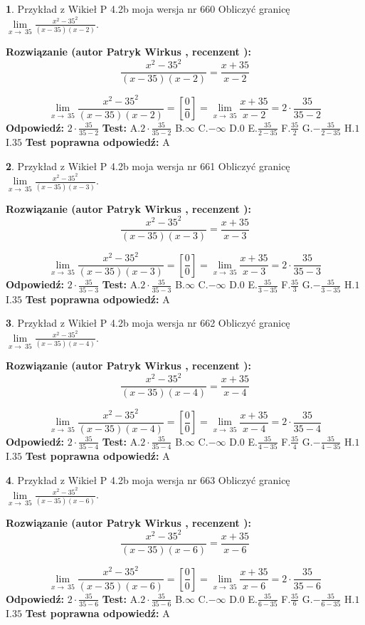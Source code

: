 \documentclass[12pt, a4paper]{article}
\theoremstyle{definition} %
\newtheorem{zad}{}
\newcommand{\zadStart}[1]{\begin{zad}#1\newline}
\newcommand{\zadStop}{\end{zad}}
\newcommand{\rozwStart}[2]{\noindent \textbf{Rozwiązanie (autor #1 , recenzent #2): }\newline}
\newcommand{\rozwStop}{\newline}
\newcommand{\odpStart}{\noindent \textbf{Odpowiedź:}\newline}
\newcommand{\odpStop}{\newline}
\newcommand{\testStart}{\noindent \textbf{Test:}\newline}
\newcommand{\testStop}{\newline}
\newcommand{\kluczStart}{\noindent \textbf{Test poprawna odpowiedź:}\newline}
\newcommand{\kluczStop}{\newline}
\begin{document}
\zadStart{Przykład z Wikieł P 4.2b moja wersja nr 660}
Obliczyć granicę $\lim\limits_{x\to\ 35}\frac{x^{2}-35^{2}}{(x-35)(x-2)}$.
\zadStop
\rozwStart{Patryk Wirkus}{}
$$\frac{x^{2}-35^{2}}{(x-35)(x-2)}=\frac{x+35}{x-2}$$

$$\lim\limits_{x\to\ 35}\frac{x^{2}-35^{2}}{(x-35)(x-2)}=[\frac{0}{0}]=\lim\limits_{x\to\ 35}\frac{x+35}{x-2}=2 \cdot \frac{35}{35-2}$$
\rozwStop
\odpStart
$2 \cdot \frac{35}{35-2}$
\odpStop
\testStart
A.$2 \cdot \frac{35}{35-2}$
B.$\infty$
C.$-\infty$
D.$0$
E.$\frac{35}{2-35}$
F.$\frac{35}{2}$
G.$-\frac{35}{2-35}$
H.$1$
I.$35$
\testStop
\kluczStart
A
\kluczStop



\zadStart{Przykład z Wikieł P 4.2b moja wersja nr 661}
Obliczyć granicę $\lim\limits_{x\to\ 35}\frac{x^{2}-35^{2}}{(x-35)(x-3)}$.
\zadStop
\rozwStart{Patryk Wirkus}{}
$$\frac{x^{2}-35^{2}}{(x-35)(x-3)}=\frac{x+35}{x-3}$$

$$\lim\limits_{x\to\ 35}\frac{x^{2}-35^{2}}{(x-35)(x-3)}=[\frac{0}{0}]=\lim\limits_{x\to\ 35}\frac{x+35}{x-3}=2 \cdot \frac{35}{35-3}$$
\rozwStop
\odpStart
$2 \cdot \frac{35}{35-3}$
\odpStop
\testStart
A.$2 \cdot \frac{35}{35-3}$
B.$\infty$
C.$-\infty$
D.$0$
E.$\frac{35}{3-35}$
F.$\frac{35}{3}$
G.$-\frac{35}{3-35}$
H.$1$
I.$35$
\testStop
\kluczStart
A
\kluczStop



\zadStart{Przykład z Wikieł P 4.2b moja wersja nr 662}
Obliczyć granicę $\lim\limits_{x\to\ 35}\frac{x^{2}-35^{2}}{(x-35)(x-4)}$.
\zadStop
\rozwStart{Patryk Wirkus}{}
$$\frac{x^{2}-35^{2}}{(x-35)(x-4)}=\frac{x+35}{x-4}$$

$$\lim\limits_{x\to\ 35}\frac{x^{2}-35^{2}}{(x-35)(x-4)}=[\frac{0}{0}]=\lim\limits_{x\to\ 35}\frac{x+35}{x-4}=2 \cdot \frac{35}{35-4}$$
\rozwStop
\odpStart
$2 \cdot \frac{35}{35-4}$
\odpStop
\testStart
A.$2 \cdot \frac{35}{35-4}$
B.$\infty$
C.$-\infty$
D.$0$
E.$\frac{35}{4-35}$
F.$\frac{35}{4}$
G.$-\frac{35}{4-35}$
H.$1$
I.$35$
\testStop
\kluczStart
A
\kluczStop



\zadStart{Przykład z Wikieł P 4.2b moja wersja nr 663}
Obliczyć granicę $\lim\limits_{x\to\ 35}\frac{x^{2}-35^{2}}{(x-35)(x-6)}$.
\zadStop
\rozwStart{Patryk Wirkus}{}
$$\frac{x^{2}-35^{2}}{(x-35)(x-6)}=\frac{x+35}{x-6}$$

$$\lim\limits_{x\to\ 35}\frac{x^{2}-35^{2}}{(x-35)(x-6)}=[\frac{0}{0}]=\lim\limits_{x\to\ 35}\frac{x+35}{x-6}=2 \cdot \frac{35}{35-6}$$
\rozwStop
\odpStart
$2 \cdot \frac{35}{35-6}$
\odpStop
\testStart
A.$2 \cdot \frac{35}{35-6}$
B.$\infty$
C.$-\infty$
D.$0$
E.$\frac{35}{6-35}$
F.$\frac{35}{6}$
G.$-\frac{35}{6-35}$
H.$1$
I.$35$
\testStop
\kluczStart
A
\kluczStop
\end{document}
